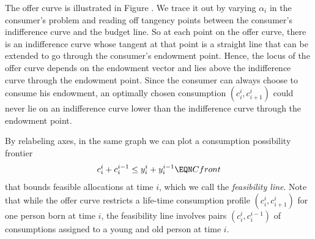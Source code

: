 The offer curve is illustrated in Figure . %
We trace it out by varying $\alpha_i$ in the consumer's problem and
reading off tangency points between the consumer's indifference
curve and the budget line.  
So at each point on the offer curve, there
is an indifference curve whose tangent at
that point  is a straight line that can
be extended to go through the consumer's 
endowment point.
Hence, the locus of the offer curve depends
on the endowment vector and  lies above the 
indifference curve through
the endowment point.  
Since the consumer can always choose to 
consume his endowment, an  optimally
chosen consumption $(c_i^i, c^i_{i+1})$  could 
never lie on an indifference curve lower than 
the indifference curve through the endowment
point. 




By relabeling axes, in the same graph we can plot a consumption possibility frontier
$$ c_i^i + c_i^{i-1} \leq y_i^i + y_i^{i-1}    \EQN Cfront$$
that bounds feasible allocations at time $i$, which we
call the {\it feasibility line}.  Note that while the offer
curve restricts a life-time consumption
profile $(c_i^i, c_{i+1}^i)$ for one person born at time $i$, the feasibility line involves 
pairs $(c_i^i, c_i^{i-1})$ of consumptions assigned to a young and old person at time $i$.



